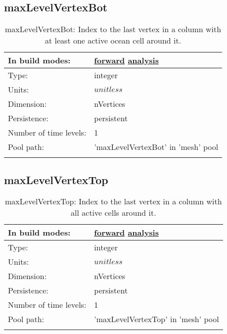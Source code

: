 \subsection[maxLevelVertexBot]{maxLevelVertexBot}
\label{subsec:var_sec_mesh_maxLevelVertexBot}
\begin{center}
\begin{longtable}{| p{2.0in} | p{4.0in} |}
        \hline 
        In build modes: & \hyperref[subsec:forward_var_tab_mesh]{forward} \hyperref[subsec:analysis_var_tab_mesh]{analysis} \\
        \hline 
        Type: & integer \\
        \hline 
        Units: & $unitless$ \\
        \hline 
        Dimension: & nVertices \\
        \hline 
        Persistence: & persistent \\
        \hline 
        Number of time levels: & 1 \\
        \hline 
            Pool path: & 'maxLevelVertexBot' in 'mesh' pool
 \\
		 \hline 
    \caption{maxLevelVertexBot: Index to the last vertex in a column with at least one active ocean cell around it.}
\end{longtable}
\end{center}
\subsection[maxLevelVertexTop]{maxLevelVertexTop}
\label{subsec:var_sec_mesh_maxLevelVertexTop}
\begin{center}
\begin{longtable}{| p{2.0in} | p{4.0in} |}
        \hline 
        In build modes: & \hyperref[subsec:forward_var_tab_mesh]{forward} \hyperref[subsec:analysis_var_tab_mesh]{analysis} \\
        \hline 
        Type: & integer \\
        \hline 
        Units: & $unitless$ \\
        \hline 
        Dimension: & nVertices \\
        \hline 
        Persistence: & persistent \\
        \hline 
        Number of time levels: & 1 \\
        \hline 
            Pool path: & 'maxLevelVertexTop' in 'mesh' pool
 \\
		 \hline 
    \caption{maxLevelVertexTop: Index to the last vertex in a column with all active cells around it.}
\end{longtable}
\end{center}
